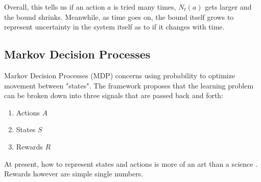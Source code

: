 Overall, this tells us if an action $a$ is tried many times, $N_t(a)$ gets larger and the bound shrinks. Meanwhile, as time goes on, the bound itself grows to represent uncertainty in the system itself as to if it changes with time.


\subsection{Markov Decision Processes}
Markov Decision Processes (MDP) concerns using probability to optimize movement between "states". The framework proposes that the learning problem can be broken down into three signals that are passed back and forth: 
\begin{enumerate}
	\item Actions $A$
	\item States $S$
	\item Rewards $R$
\end{enumerate}
At present, how to represent states and actions is more of an art than a science \cite{sutton}. Rewards however are simple single numbers.
